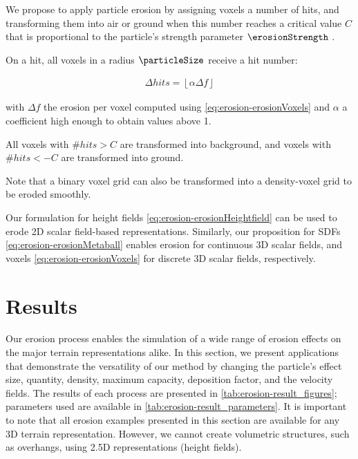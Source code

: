 We propose to apply particle erosion by assigning voxels a number of hits, and transforming them into air or ground when this number reaches a critical value $C$ that is proportional to the particle's strength parameter $\erosionStrength$ \cite{Jones2010}. 

On a hit, all voxels in a radius $\particleSize$ receive a hit number: 

\begin{align}
    \label{eq:erosion-erosionDiscreteVoxels}
    \Delta hits = \left\lfloor \alpha \Delta f \right\rfloor
\end{align}

with $\Delta f$ the erosion per voxel computed using \cref{eq:erosion-erosionVoxels} and $\alpha$ a coefficient high enough to obtain values above 1. 

All voxels with $\# hits > C$ are transformed into background, and voxels with $\# hits < -C$ are transformed into ground.

Note that a binary voxel grid can also be transformed into a density-voxel grid to be eroded smoothly.

Our formulation for height fields \cref{eq:erosion-erosionHeightfield} can be used to erode 2D scalar field-based representations. Similarly,  
our proposition for SDFs \cref{eq:erosion-erosionMetaball} enables erosion for continuous 3D scalar fields, and voxels \cref{eq:erosion-erosionVoxels} for discrete 3D scalar fields, respectively.


\section{Results}
\label{sec:erosion-erosion-examples}

Our erosion process enables the simulation of a wide range of erosion effects on the major terrain representations alike. In this section, we present applications that demonstrate the versatility of our method by changing the particle's effect size, quantity, density, maximum capacity, deposition factor, and the velocity fields. The results of each process are presented in \cref{tab:erosion-result_figures}; parameters used are available in \cref{tab:erosion-result_parameters}.  
It is important to note that all erosion examples presented in this section are available for any 3D terrain representation. However, we cannot create volumetric structures, such as overhangs, using 2.5D representations (height fields).

